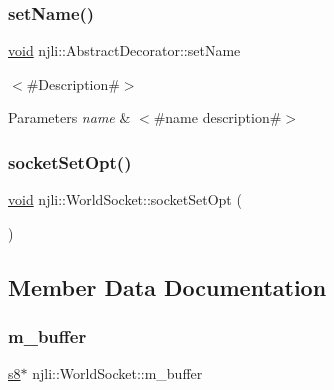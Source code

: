 \mbox{\label{classnjli_1_1_world_socket_a087eb5f8d9f51cc476f12f1d10a3cb95}} 
\subsubsection{\texorpdfstring{set\+Name()}{setName()}}
{\footnotesize\ttfamily \mbox{\hyperlink{_thread_8h_af1e856da2e658414cb2456cb6f7ebc66}{void}} njli\+::\+Abstract\+Decorator\+::set\+Name}

$<$\#\+Description\#$>$


\begin{DoxyParams}{Parameters}
{\em name} & $<$\#name description\#$>$ \\
\hline
\end{DoxyParams}
\mbox{\label{classnjli_1_1_world_socket_ae15dc1f2db17e7ef5faccc4e6ad335e9}} 
\subsubsection{\texorpdfstring{socket\+Set\+Opt()}{socketSetOpt()}}
{\footnotesize\ttfamily \mbox{\hyperlink{_thread_8h_af1e856da2e658414cb2456cb6f7ebc66}{void}} njli\+::\+World\+Socket\+::socket\+Set\+Opt (\begin{DoxyParamCaption}{ }\end{DoxyParamCaption})\hspace{0.3cm}{\ttfamily [protected]}}



\subsection{Member Data Documentation}
\mbox{\label{classnjli_1_1_world_socket_a20a56b50c5086151d1ceb67034ae4cd1}} 
\subsubsection{\texorpdfstring{m\+\_\+buffer}{m\_buffer}}
{\footnotesize\ttfamily \mbox{\hyperlink{_util_8h_a2ff401e087cf786c38a6812723e94473}{s8}}$\ast$ njli\+::\+World\+Socket\+::m\+\_\+buffer\hspace{0.3cm}{\ttfamily [private]}}



